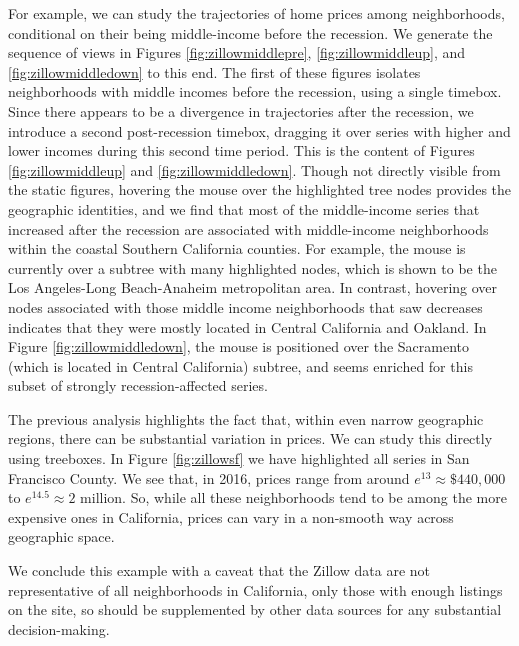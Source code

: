 \documentclass[12pt]{article}
\begin{document}
For example, we can study the trajectories of home prices among neighborhoods,
conditional on their being middle-income before the recession. We generate the
sequence of views in Figures \ref{fig:zillowmiddlepre},
\ref{fig:zillowmiddleup}, and \ref{fig:zillowmiddledown} to this end. The first
of these figures isolates neighborhoods with middle incomes before the
recession, using a single timebox. Since there appears to be a divergence in
trajectories after the recession, we introduce a second post-recession timebox,
dragging it over series with higher and lower incomes during this second time
period. This is the content of Figures \ref{fig:zillowmiddleup} and
\ref{fig:zillowmiddledown}. Though not directly visible from the static figures,
hovering the mouse over the highlighted tree nodes provides the geographic
identities, and we find that most of the middle-income series that increased
after the recession are associated with middle-income neighborhoods within the
coastal Southern California counties. For example, the mouse is currently over a
subtree with many highlighted nodes, which is shown to be the Los Angeles-Long
Beach-Anaheim metropolitan area. In contrast, hovering over nodes associated
with those middle income neighborhoods that saw decreases indicates that they
were mostly located in Central California and Oakland. In Figure
\ref{fig:zillowmiddledown}, the mouse is positioned over the Sacramento (which
is located in Central California) subtree, and seems enriched for this subset of
strongly recession-affected series.

The previous analysis highlights the fact that, within even narrow geographic
regions, there can be substantial variation in prices. We can study this
directly using treeboxes. In Figure \ref{fig:zillowsf} we have highlighted all
series in San Francisco County. We see that, in 2016, prices range from around
$e^{13} \approx \$440,000$ to $e^{14.5} \approx 2 \text{ million}$. So,
while all these neighborhoods tend to be among the more expensive ones in
California, prices can vary in a non-smooth way across geographic space.

We conclude this example with a caveat that the Zillow data are not
representative of all neighborhoods in California, only those with enough
listings on the site, so should be supplemented by other data sources for any
substantial decision-making.
\end{document}
